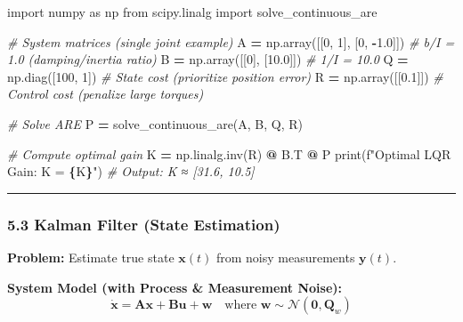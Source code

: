 \documentclass[
]{article}
\newenvironment{Shaded}{\begin{snugshade}}{\end{snugshade}}
\newcommand{\BuiltInTok}[1]{#1}
\newcommand{\CommentTok}[1]{\textcolor[rgb]{0.56,0.35,0.01}{\textit{#1}}}
\newcommand{\DecValTok}[1]{\textcolor[rgb]{0.00,0.00,0.81}{#1}}
\newcommand{\FloatTok}[1]{\textcolor[rgb]{0.00,0.00,0.81}{#1}}
\newcommand{\ImportTok}[1]{#1}
\newcommand{\NormalTok}[1]{#1}
\newcommand{\OperatorTok}[1]{\textcolor[rgb]{0.81,0.36,0.00}{\textbf{#1}}}
\newcommand{\SpecialCharTok}[1]{\textcolor[rgb]{0.81,0.36,0.00}{\textbf{#1}}}
\newcommand{\SpecialStringTok}[1]{\textcolor[rgb]{0.31,0.60,0.02}{#1}}
\begin{document}
\begin{Shaded}
\begin{Highlighting}[]
\ImportTok{import}\NormalTok{ numpy }\ImportTok{as}\NormalTok{ np}
\ImportTok{from}\NormalTok{ scipy.linalg }\ImportTok{import}\NormalTok{ solve\_continuous\_are}

\CommentTok{\# System matrices (single joint example)}
\NormalTok{A }\OperatorTok{=}\NormalTok{ np.array([[}\DecValTok{0}\NormalTok{, }\DecValTok{1}\NormalTok{], [}\DecValTok{0}\NormalTok{, }\OperatorTok{{-}}\FloatTok{1.0}\NormalTok{]])  }\CommentTok{\# b/I = 1.0 (damping/inertia ratio)}
\NormalTok{B }\OperatorTok{=}\NormalTok{ np.array([[}\DecValTok{0}\NormalTok{], [}\FloatTok{10.0}\NormalTok{]])        }\CommentTok{\# 1/I = 10.0}
\NormalTok{Q }\OperatorTok{=}\NormalTok{ np.diag([}\DecValTok{100}\NormalTok{, }\DecValTok{1}\NormalTok{])              }\CommentTok{\# State cost (prioritize position error)}
\NormalTok{R }\OperatorTok{=}\NormalTok{ np.array([[}\FloatTok{0.1}\NormalTok{]])              }\CommentTok{\# Control cost (penalize large torques)}

\CommentTok{\# Solve ARE}
\NormalTok{P }\OperatorTok{=}\NormalTok{ solve\_continuous\_are(A, B, Q, R)}

\CommentTok{\# Compute optimal gain}
\NormalTok{K }\OperatorTok{=}\NormalTok{ np.linalg.inv(R) }\OperatorTok{@}\NormalTok{ B.T }\OperatorTok{@}\NormalTok{ P}
\BuiltInTok{print}\NormalTok{(}\SpecialStringTok{f"Optimal LQR Gain: K = }\SpecialCharTok{\{}\NormalTok{K}\SpecialCharTok{\}}\SpecialStringTok{"}\NormalTok{)  }\CommentTok{\# Output: K ≈ [31.6, 10.5]}
\end{Highlighting}
\end{Shaded}

\begin{center}\rule{0.5\linewidth}{0.5pt}\end{center}

\hypertarget{kalman-filter-state-estimation}{%
\subsubsection{5.3 Kalman Filter (State
Estimation)}\label{kalman-filter-state-estimation}}

\textbf{Problem:} Estimate true state \(\mathbf{x}(t)\) from noisy
measurements \(\mathbf{y}(t)\).

\textbf{System Model (with Process \& Measurement Noise):} \[
\dot{\mathbf{x}} = \mathbf{A} \mathbf{x} + \mathbf{B} \mathbf{u} + \mathbf{w} \quad \text{where } \mathbf{w} \sim \mathcal{N}(\mathbf{0}, \mathbf{Q}_w)
\]
\end{document}
